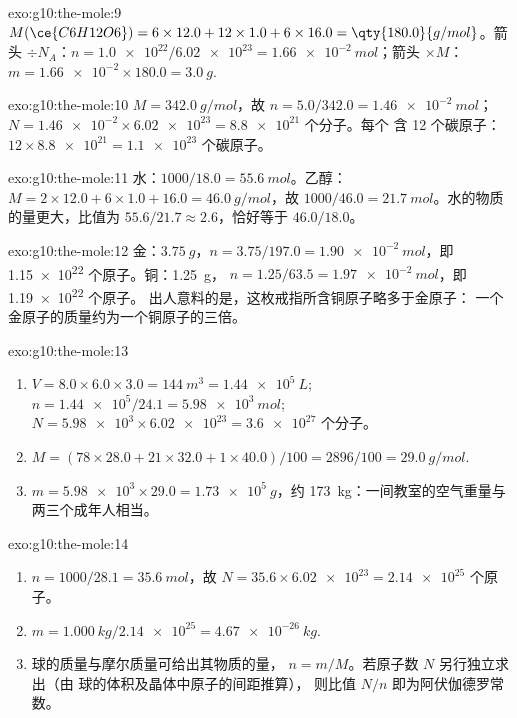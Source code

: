 \begin{solution}{exo:g10:the-mole:9}
$M(\ce{C6H12O6}) = 6 \times 12.0 + 12 \times 1.0 + 6 \times 16.0 =
\qty{180.0}{g/mol}$。箭头 $\div N_A$：$n = \num{1.0e22} / \num{6.02e23} =
\qty{1.66e-2}{mol}$；箭头 $\times M$：$m = \num{1.66e-2} \times 180.0 =
\qty{3.0}{g}$.
\end{solution}

\begin{solution}{exo:g10:the-mole:10}
$M = \qty{342.0}{g/mol}$，故 $n = 5.0 / 342.0 = \qty{1.46e-2}{mol}$；
$N = \num{1.46e-2} \times \num{6.02e23} = \num{8.8e21}$ 个分子。每个
含 12 个碳原子：$12 \times \num{8.8e21} = \num{1.1e23}$ 个碳原子。
\end{solution}

\begin{solution}{exo:g10:the-mole:11}
水：$1000 / 18.0 = \qty{55.6}{mol}$。乙醇：
$M = 2 \times 12.0 + 6 \times 1.0 + 16.0 = \qty{46.0}{g/mol}$，故
$1000 / 46.0 = \qty{21.7}{mol}$。水的物质的量更大，比值为
$55.6 / 21.7 \approx 2.6$，恰好等于 $46.0 / 18.0$。
\end{solution}

\begin{solution}{exo:g10:the-mole:12}
金：$\qty{3.75}{g}$，$n = 3.75 / 197.0 = \qty{1.90e-2}{mol}$，即
\num{1.15e22} 个原子。铜：\qty{1.25}{g}，
$n = 1.25 / 63.5 = \qty{1.97e-2}{mol}$，即 \num{1.19e22} 个原子。
出人意料的是，这枚戒指所含铜原子略多于金原子：
一个金原子的质量约为一个铜原子的三倍。
\end{solution}

\begin{solution}{exo:g10:the-mole:13}
\begin{enumerate}
  \item $V = 8.0 \times 6.0 \times 3.0 = \qty{144}{m^3} =
        \qty{1.44e5}{L}$; $n = \num{1.44e5} / 24.1 = \qty{5.98e3}{mol}$;
        $N = \num{5.98e3} \times \num{6.02e23} = \num{3.6e27}$ 个分子。
  \item $M = (78 \times 28.0 + 21 \times 32.0 + 1 \times 40.0) / 100 =
        2896 / 100 = \qty{29.0}{g/mol}$.
  \item $m = \num{5.98e3} \times 29.0 = \qty{1.73e5}{g}$，约
        \qty{173}{kg}：一间教室的空气重量与
        两三个成年人相当。
\end{enumerate}
\end{solution}

\begin{solution}{exo:g10:the-mole:14}
\begin{enumerate}
  \item $n = 1000 / 28.1 = \qty{35.6}{mol}$，故
        $N = 35.6 \times \num{6.02e23} = \num{2.14e25}$ 个原子。
  \item $m = \qty{1.000}{kg} / \num{2.14e25} = \qty{4.67e-26}{kg}$.
  \item 球的质量与摩尔质量可给出其物质的量，
        $n = m / M$。若原子数 $N$ 另行独立求出（由
        球的体积及晶体中原子的间距推算），
        则比值 $N / n$ 即为阿伏伽德罗常数。
\end{enumerate}
\end{solution}


